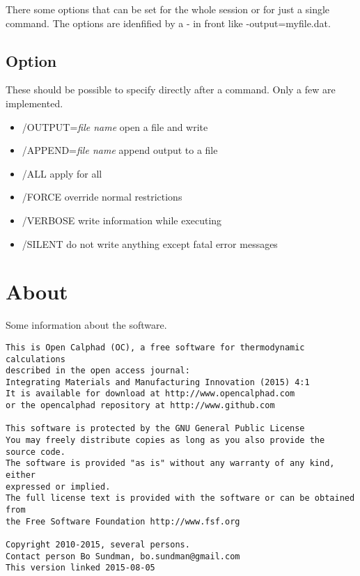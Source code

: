 \documentclass[12pt]{article}
\begin{document}
There some options that can be set for the whole session or for just a
single command.  The options are idenfified by a - in front like
-output=myfile.dat.

\subsection{Option}

These should be possible to specify directly after a command.  Only a
few are implemented.

\begin{itemize}
\item /OUTPUT={\em file name} open a file and write
\item /APPEND={\em file name} append output to a file
\item /ALL apply for all
\item /FORCE override normal restrictions
\item /VERBOSE write information while executing
\item /SILENT do not write anything except fatal error messages
\end{itemize}
\section{About}

Some information about the software.

\begin{verbatim}
This is Open Calphad (OC), a free software for thermodynamic calculations
described in the open access journal:
Integrating Materials and Manufacturing Innovation (2015) 4:1
It is available for download at http://www.opencalphad.com
or the opencalphad repository at http://www.github.com

This software is protected by the GNU General Public License
You may freely distribute copies as long as you also provide the source code.
The software is provided "as is" without any warranty of any kind, either
expressed or implied.
The full license text is provided with the software or can be obtained from
the Free Software Foundation http://www.fsf.org

Copyright 2010-2015, several persons.
Contact person Bo Sundman, bo.sundman@gmail.com
This version linked 2015-08-05
\end{verbatim}
\end{document}
